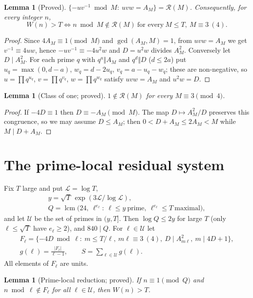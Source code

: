 \documentclass[11pt,reqno]{amsart}
\newtheorem{lemma}[theorem]{Lemma}
\theoremstyle{definition}
\newcommand{\lcm}{\operatorname{lcm}}
\newcommand{\cR}{\mathcal R}
\newcommand{\cU}{\mathcal U}
\newcommand{\Lc}{\mathcal L}
\begin{document}
\begin{lemma}[Proved]\label{lem:atoms}
$\{-uv^{-1}\bmod M:\ uvw=A_M\}=\cR(M)$.  Consequently, for every integer $n$,
\[
 W(n)>T\iff n\bmod M\notin\cR(M)\ \text{for every}\ M\le T,\ M\equiv3\ (4).
\]
\end{lemma}

\begin{proof}
Since $4A_M\equiv1\pmod M$ and $\gcd(A_M,M)=1$, from $uvw=A_M$ we get
$v^{-1}\equiv4uw$, hence $-uv^{-1}\equiv-4u^2w$ and $D=u^2w$ divides $A_M^2$.
Conversely let $D\mid A_M^2$.  For each prime $q$ with $q^a\Vert A_M$ and
$q^d\Vert D$ ($d\le2a$) put $u_q=\max(0,d-a)$, $w_q=d-2u_q$, $v_q=a-u_q-w_q$;
these are non-negative, so $u=\prod q^{u_q}$, $v=\prod q^{v_q}$,
$w=\prod q^{w_q}$ satisfy $uvw=A_M$ and $u^2w=D$.
\end{proof}

\begin{lemma}[Class of one; proved]\label{lem:one}
$1\notin\cR(M)$ for every $M\equiv3\pmod4$.
\end{lemma}

\begin{proof}
If $-4D\equiv1$ then $D\equiv-A_M\pmod M$.  The map $D\mapsto A_M^2/D$
preserves this congruence, so we may assume $D\le A_M$; then
$0<D+A_M\le2A_M<M$ while $M\mid D+A_M$.
\end{proof}

\section{The prime-local residual system}\label{sec:local}

Fix $T$ large and put $\Lc=\log T$,
\begin{gather*}
 y=\sqrt T\,\exp(3\Lc/\log\Lc),\\
 Q=\lcm\big(24,\ \ell^{e_\ell}:\ \ell\le y\ \text{prime},\ \ell^{e_\ell}\le T\ \text{maximal}\big),
\end{gather*}
and let $\cU$ be the set of primes in $(y,T]$.  Then $\log Q\le2y$ for large
$T$ (only $\ell\le\sqrt T$ have $e_\ell\ge2$), and $840\mid Q$.  For
$\ell\in\cU$ let
\begin{gather*}
 F_\ell=\{-4D\bmod\ell:\ m\le T/\ell,\ m\ell\equiv3\ (4),\ D\mid A_{m\ell}^2,\
 m\mid 4D+1\},\\
 g(\ell)=\frac{|F_\ell|}{\ell-1},\qquad S=\sum_{\ell\in\cU}g(\ell).
\end{gather*}
All elements of $F_\ell$ are units.

\begin{lemma}[Prime-local reduction; proved]\label{lem:local}
If $n\equiv1\pmod Q$ and $n\bmod\ell\notin F_\ell$ for all $\ell\in\cU$,
then $W(n)>T$.
\end{lemma}
\end{document}

